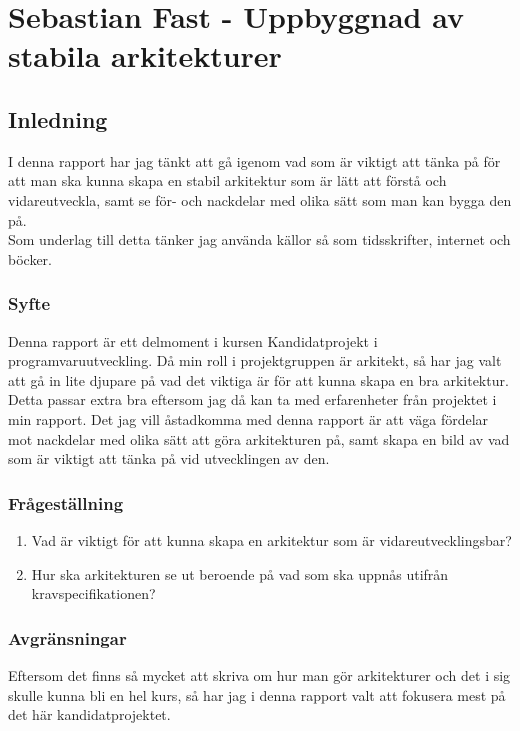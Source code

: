 \section{Sebastian Fast - Uppbyggnad av stabila arkitekturer}
\subsection{Inledning}
I denna rapport har jag tänkt att gå igenom vad som är viktigt att tänka på för att man ska kunna skapa en stabil arkitektur som är lätt att förstå och vidareutveckla, samt se för- och nackdelar med olika sätt som man kan bygga den på.
\\
Som underlag till detta tänker jag använda källor så som tidsskrifter, internet och böcker.   
\subsubsection{Syfte}
Denna rapport är ett delmoment i kursen Kandidatprojekt i programvaruutveckling. Då min roll i projektgruppen är arkitekt, så har jag valt att gå in lite djupare på vad det viktiga är för att kunna skapa en bra arkitektur. Detta passar extra bra eftersom jag då kan ta med erfarenheter från projektet i min rapport.
Det jag vill åstadkomma med denna rapport är att väga fördelar mot nackdelar med olika sätt att göra arkitekturen på, samt skapa en bild av vad som är viktigt att tänka på vid utvecklingen av den.
\subsubsection{Frågeställning}
\begin{enumerate}
	\item Vad är viktigt för att kunna skapa en arkitektur som är vidareutvecklingsbar?
	\item Hur ska arkitekturen se ut beroende på vad som ska uppnås utifrån kravspecifikationen?
\end{enumerate}
\subsubsection{Avgränsningar}
Eftersom det finns så mycket att skriva om hur man gör arkitekturer och det i sig skulle kunna bli en hel kurs, så har jag i denna rapport valt att fokusera mest på det här kandidatprojektet.
